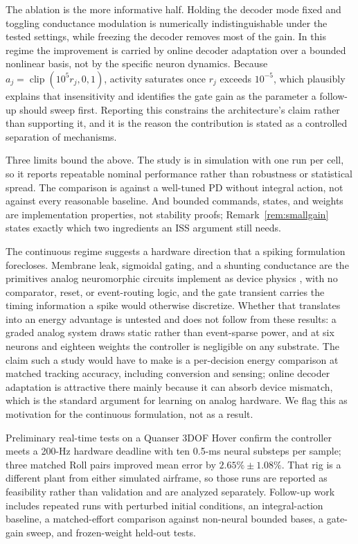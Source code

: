 \documentclass[letterpaper,10pt,conference]{IEEEtran}
\newcommand{\clip}{\operatorname{clip}}
\begin{document}
The ablation is the more informative half. Holding the decoder mode fixed
and toggling conductance modulation is numerically indistinguishable under
the tested settings, while freezing the decoder removes most of the gain.
In this regime the improvement is carried by online decoder adaptation over
a bounded nonlinear basis, not by the specific neuron dynamics. Because
$a_j=\clip(10^5r_j,0,1)$, activity saturates once $r_j$ exceeds $10^{-5}$,
which plausibly explains that insensitivity and identifies the gate gain as
the parameter a follow-up should sweep first. Reporting this constrains the
architecture's claim rather than supporting it, and it is the reason the
contribution is stated as a controlled separation of mechanisms.

Three limits bound the above. The study is in simulation with one run per
cell, so it reports repeatable nominal performance rather than robustness or
statistical spread. The comparison is against a well-tuned PD without
integral action, not against every reasonable baseline. And bounded
commands, states, and weights are implementation properties, not stability
proofs; Remark~\ref{rem:smallgain} states exactly which two ingredients an
ISS argument still needs.

The continuous regime suggests a hardware direction that a spiking
formulation forecloses. Membrane leak, sigmoidal gating, and a shunting
conductance are the primitives analog neuromorphic circuits implement as
device physics \cite{mahowald1991vlsi}, with no comparator, reset, or
event-routing logic, and the gate transient carries the timing information a
spike would otherwise discretize. Whether that translates into an energy
advantage is untested and does not follow from these results: a graded
analog system draws static rather than event-sparse power, and at six
neurons and eighteen weights the controller is negligible on any substrate.
The claim such a study would have to make is a per-decision energy
comparison at matched tracking accuracy, including conversion and sensing;
online decoder adaptation is attractive there mainly because it can absorb
device mismatch, which is the standard argument for learning on analog
hardware. We flag this as motivation for the continuous formulation, not as
a result.

Preliminary real-time tests on a Quanser 3DOF Hover confirm the controller
meets a 200-Hz hardware deadline with ten 0.5-ms neural substeps per sample;
three matched Roll pairs improved mean error by $2.65\%\pm1.08\%$. That rig
is a different plant from either simulated airframe, so those runs are
reported as feasibility rather than validation and are analyzed separately.
Follow-up work includes repeated runs with perturbed initial conditions,
an integral-action baseline, a matched-effort comparison against
non-neural bounded bases, a gate-gain sweep, and frozen-weight held-out
tests.



\end{document}
